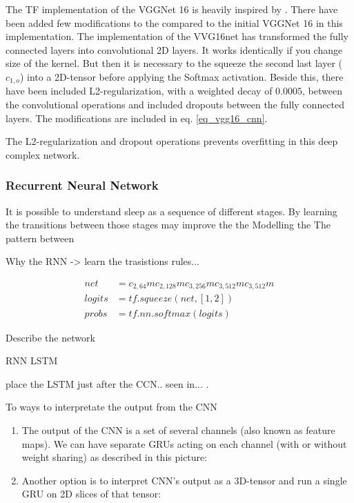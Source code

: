 The TF implementation of the VGGNet 16 is heavily inspired by \cite{git_vgg16}. There have been added few modifications to the compared to the initial VGGNet 16 \cite{VGGnet16} in this implementation. 
The implementation of the VVG16net has transformed the fully connected layers into convolutional 2D layers. It works identically if you change size of the kernel. But then it is necessary to the squeeze the second last layer ($c_{1,o}$) into a 2D-tensor before applying the Softmax activation.
Beside this, there have been included L2-regularization, with a weighted decay of $0.0005$, between the convolutional operations and included dropouts between the fully connected layers. The modifications are included in eq. \ref{eq_vgg16_cnn}.
  
 The L2-regularization and dropout operations prevents overfitting in this deep complex network. 

\subsubsection{Recurrent Neural Network}


It is possible to understand sleep as a sequence of different stages. By learning the transitions between those stages may improve the the Modelling the The pattern between 


Why the RNN -> learn the trasistions rules... 


\begin{equation}
\begin{aligned}
net &= c_{2,64}mc_{2,128}mc_{3,256}mc_{3,512}mc_{3,512}m \\%
logits &= tf.squeeze(net, [1, 2])\\
probs &= tf.nn.softmax(logits)
\end{aligned}
\label{eq_vgg16_rnn}
\end{equation}

Describe the network

RNN LSTM


place the LSTM just after the CCN.. seen in... \cite{}. 


\cite{git_lstm}


\cite{git_rnn_cnn_1}



To ways to interpretate the output from the CNN
\begin{enumerate}
\item The output of the CNN is a set of several channels (also known as feature maps). We can have separate GRUs acting on each channel (with or without weight sharing) as described in this picture:
\item Another option is to interpret CNN’s output as a 3D-tensor and run a single GRU on 2D slices of that tensor:
\end{enumerate}


